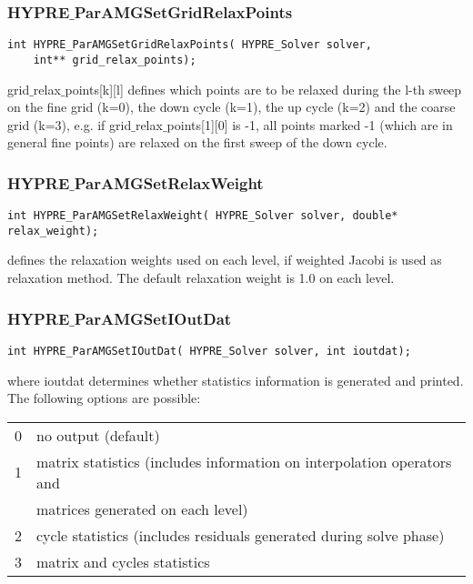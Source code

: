 \subsubsection*{HYPRE$\_$ParAMGSetGridRelaxPoints}
\begin{display}
\begin{verbatim}
int HYPRE_ParAMGSetGridRelaxPoints( HYPRE_Solver solver, 
	int** grid_relax_points);
\end{verbatim}
\end{display}
grid$\_$relax$\_$points[k][l] defines which points are to be relaxed during
the l-th sweep on the fine 
grid (k=0), the down cycle (k=1), the up cycle (k=2) and the coarse grid (k=3),
e.g. if grid$\_$relax$\_$points[1][0] is -1, all points marked -1 (which are in
general fine points) are relaxed on the first sweep of the down cycle.

\subsubsection*{HYPRE$\_$ParAMGSetRelaxWeight}
\begin{display}
\begin{verbatim}
int HYPRE_ParAMGSetRelaxWeight( HYPRE_Solver solver, double* relax_weight);
\end{verbatim}
\end{display}
defines the relaxation weights used on each level, if weighted Jacobi is used
as relaxation method. The default relaxation weight is 1.0 on each level.

\subsubsection*{HYPRE$\_$ParAMGSetIOutDat}
\begin{display}
\begin{verbatim}
int HYPRE_ParAMGSetIOutDat( HYPRE_Solver solver, int ioutdat);
\end{verbatim}
\end{display}
where ioutdat determines whether statistics information is generated and 
printed. The following options are possible:

\begin{tabular}{l l}
 0 & no output (default) \\
 1 & matrix statistics (includes information on interpolation operators and \\
 & matrices generated on each level) \\
 2 & cycle statistics (includes residuals generated during solve phase) \\
 3 & matrix and cycles statistics \\
\end{tabular}


